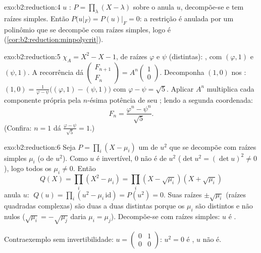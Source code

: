 \begin{solution}{exo:b2:reduction:4}
$u$ : $P = \prod_{\lambda}(X - \lambda)$ sobre o
 anula $u$, decompõe-se e tem raízes simples. Então $P(u|_F) =
P(u)|_F = 0$: a restrição é anulada por um polinômio que se decompõe
com raízes simples, logo é 
(\cref{cor:b2:reduction:minpolycrit}).
\end{solution}

\begin{solution}{exo:b2:reduction:5}
$\chi_A = X^2 - X - 1$, de raízes $\varphi$ e $\psi$ (distintas):
, com  $(\varphi, 1)$ e $(\psi, 1)$.
A recorrência dá $\begin{pmatrix} F_{n+1}\\ F_n \end{pmatrix} =
A^n \begin{pmatrix}1\\ 0\end{pmatrix}$. Decomponha $(1, 0)$ nos
: $(1,0) = \frac{1}{\varphi - \psi}\bigl((\varphi, 1) -
(\psi, 1)\bigr)$ com $\varphi - \psi = \sqrt5$. Aplicar $A^n$
multiplica cada componente própria pela $n$-ésima potência de seu ;
lendo a segunda coordenada:
\[
F_n = \frac{\varphi^n - \psi^n}{\sqrt 5} .
\]
(Confira: $n = 1$ dá $\frac{\varphi - \psi}{\sqrt5} = 1$.)
\end{solution}

\begin{solution}{exo:b2:reduction:6}
Seja $P = \prod_i (X - \mu_i)$ um  de $u^2$ que se decompõe com raízes
simples $\mu_i$ (o  de $u^2$). Como $u$ é invertível, $0$
não é  de $u^2$ ($\det u^2 = (\det u)^2 \neq 0$), logo
todos os $\mu_i \neq 0$. Então
\[
Q(X) = \prod_i (X^2 - \mu_i) = \prod_i (X - \sqrt{\mu_i})(X +
\sqrt{\mu_i})
\]
anula $u$: $\;Q(u) = \prod_i (u^2 - \mu_i\,\mathrm{id}) =
P(u^2) = 0$. Suas raízes $\pm
\sqrt{\mu_i}$ (raízes quadradas complexas) são duas a duas distintas porque
os $\mu_i$ são distintos e não nulos ($\sqrt{\mu_i} = -\sqrt{\mu_j}$
daria $\mu_i = \mu_j$). Decompõe-se com raízes simples: $u$ é
.

Contraexemplo sem invertibilidade: $u = \begin{pmatrix} 0 & 1\\
0 & 0\end{pmatrix}$: $u^2 = 0$ é , $u$ não é.
\end{solution}

